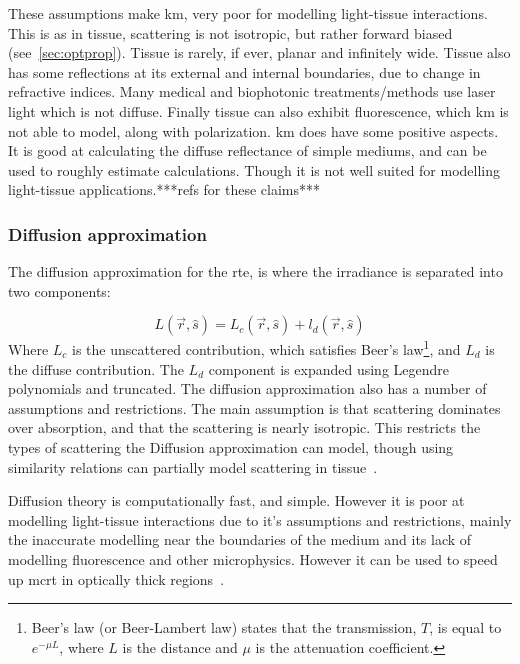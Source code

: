 These assumptions make \gls{km}, very poor for modelling light-tissue interactions. This is as in tissue, scattering is not isotropic, but rather forward biased (see~\cref{sec:optprop}). Tissue is rarely, if ever, planar and infinitely wide. Tissue also has some reflections at its external and internal boundaries, due to change in refractive indices. Many medical and biophotonic treatments/methods use laser light which is not diffuse. Finally tissue can also exhibit fluorescence, which \gls{km} is not able to model, along with polarization. 
\Gls{km} does have some positive aspects. It is good at calculating the diffuse reflectance of simple mediums, and can be used to roughly estimate calculations. Though it is not well suited for modelling light-tissue applications.***refs for these claims***

\subsubsection*{Diffusion approximation}
The diffusion approximation for the \gls{rte}, is where the irradiance is separated into two components:

\begin{equation}
	L(\vec{r},\hat{s}) = L_c(\vec{r},\hat{s}) +l_d(\vec{r},\hat{s})
\end{equation}
Where $L_c$ is the unscattered contribution, which satisfies Beer's law\footnote{Beer's law (or Beer-Lambert law) states that the transmission, $T$, is equal to $e^{-\mu L}$, where $L$ is the distance and $\mu$ is the attenuation coefficient.}, and $L_d$ is the diffuse contribution. The $L_d$ component is expanded using Legendre polynomials and truncated. 
The diffusion approximation also has a number of assumptions and restrictions. The main assumption is that scattering dominates over absorption, and that the scattering is nearly isotropic. This restricts the types of scattering the Diffusion approximation can model, though using similarity relations can partially model scattering in tissue~\cite{graaff1993similarity,yoon1989accuracies}.

Diffusion theory is computationally fast, and simple. However it is poor at modelling light-tissue interactions due to it's assumptions and restrictions, mainly the inaccurate modelling near the boundaries of the medium and its lack of modelling fluorescence and other microphysics. However it can be used to speed up \gls{mcrt} in optically thick regions~\cite{robitaille2010modified,min2009radiative}.

